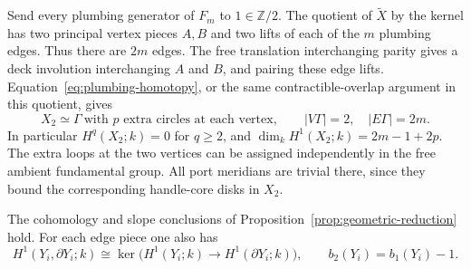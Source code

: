 Send every plumbing generator of \(F_m\) to \(1\in\mathbb Z/2\).
The quotient of \(\widetilde X\) by the kernel has two principal vertex
pieces \(A,B\) and two lifts of each of the \(m\) plumbing edges.
Thus there are \(2m\) edges. The free translation interchanging parity
gives a deck involution interchanging \(A\) and \(B\), and pairing these
edge lifts. Equation~\eqref{eq:plumbing-homotopy}, or the same
contractible-overlap argument in this quotient, gives
\begin{equation}
\label{eq:parity-homotopy}
 X_2\simeq\Gamma\ \text{with \(p\) extra circles at each vertex},
 \qquad
 |V\Gamma|=2,\quad |E\Gamma|=2m.
\end{equation}
In particular \(H^q(X_2;k)=0\) for \(q\geq2\), and
\(\dim_kH^1(X_2;k)=2m-1+2p\).
The extra loops at the two vertices can be assigned independently in
the free ambient fundamental group. All port meridians are trivial
there, since they bound the corresponding handle-core disks in \(X_2\).

\begin{lemma}
\label{lem:geometric-edge-cohomology}
The cohomology and slope conclusions of
Proposition~\ref{prop:geometric-reduction} hold.
For each edge piece one also has
\begin{equation}
\label{eq:edge-relative-cohomology}
 H^1(Y_i,\partial Y_i;k)
  \cong\ker\bigl(H^1(Y_i;k)\longrightarrow H^1(\partial Y_i;k)\bigr),
 \qquad b_2(Y_i)=b_1(Y_i)-1.
\end{equation}
\end{lemma}

